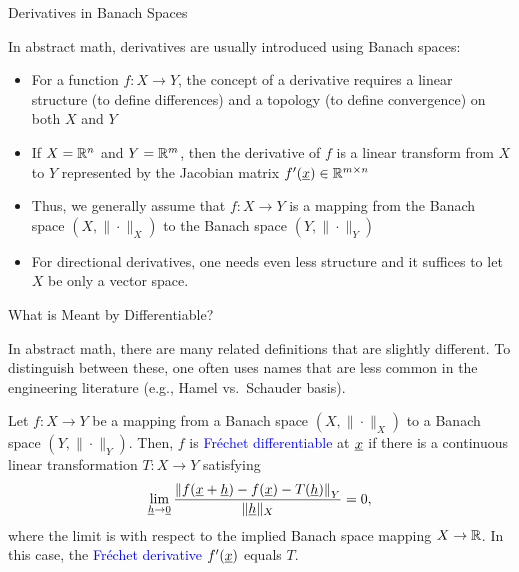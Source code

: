 \documentclass[10pt,english,aspectratio=169]{beamer}
\begin{document}
\begin{frame}{Derivatives in Banach Spaces}

In abstract math, derivatives are usually introduced using Banach spaces: \vspace{1mm}
\begin{itemize}
\setlength\itemsep{3mm}
\item<1-> For a function $f \colon X \rightarrow Y$, the concept of a derivative requires a linear structure (to define differences) and a topology (to define convergence) on both $X$ and $Y$ \vspace{1mm}

\item<2-> If $X=\mathbb{R}^n$ and $Y=\mathbb{R}^m$, then the derivative of $f$ is a linear transform from $X$ to $Y$ represented by the Jacobian matrix $f'(\underline{x}) \in \mathbb{R}^{m\times n}$ \vspace{1mm}

\item<3-> Thus, we generally assume that $f \colon X \rightarrow Y$ is a mapping from the Banach space $(X,\|\cdot\|_X)$ to the Banach space $(Y,\|\cdot\|_Y)$ \vspace{1mm}

\item<4-> For directional derivatives, one needs even less structure and it suffices to let $X$ be only a vector space.

\end{itemize}
\end{frame}

\begin{frame}{What is Meant by Differentiable?}

In abstract math, there are many related definitions that are slightly different.
To distinguish between these, one often uses names that are less common in the engineering literature (e.g., Hamel vs.\ Schauder basis).

\vspace{3mm}

\begin{definition}[Differentiable]
Let $f \colon X \rightarrow Y$ be a mapping from a Banach space $(X,\|\cdot\|_X)$ to a Banach space $(Y,\|\cdot\|_Y)$.
Then, $f$ is \textcolor{blue}{Fr\'{e}chet differentiable} at $\underline{x}$ if there is a continuous linear transformation $T\colon X \to Y$ satisfying
\begin{equation*} \lim_{\underline{h} \to \underline{0}} \frac{\left\|f(\underline{x}+ \underline{h}) - f(\underline{x}) - T(\underline{h}) \right\|_Y}{\| \underline{h} \|_X} = 0,
\end{equation*}
where the limit is with respect to the implied Banach space mapping $X\to \mathbb{R}$.
In this case, the \textcolor{blue}{Fr\'{e}chet derivative} $f'(\underline{x})$ equals $T$.
\end{definition}
\end{frame}
\end{document}
